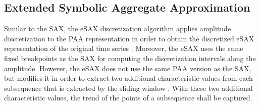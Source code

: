 \newpage
\subsection{Extended Symbolic Aggregate Approximation}
Similar to the \ac{SAX}, the \ac{eSAX} discretization algorithm applies amplitude discretization to the \ac{PAA} representation in order to obtain the discretized \ac{eSAX} representation of the original time series \cite{E_SAX}. Moreover, the \ac{eSAX} uses the same fixed breakpoints as the \ac{SAX} for computing the discretization intervals along the amplitude. \newline
However, the \ac{eSAX} does not use the same \ac{PAA} version as the \ac{SAX}, but modifies it in order to extract two additional characteristic values from each subsequence that is extracted by the sliding window \cite{E_SAX}. With these two additional characteristic values, the trend of the points of a subsequence shall be captured.
\newpage
